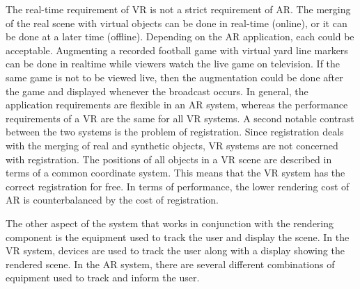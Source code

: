 The real-time requirement of VR is not a strict requirement of AR. The merging of the real scene with virtual objects can be done in real-time (online), or it can be done at a later time (offline). Depending on the AR application, each could be acceptable. Augmenting a recorded football game with virtual yard line markers can be done in realtime while viewers watch the live game on television. If the same game is not to be viewed live, then the augmentation could be done after the game and displayed whenever the broadcast occurs. In general, the application requirements are flexible in an AR system, whereas the performance requirements of a VR are the same for all VR systems. A second notable contrast between the two systems is the problem of registration. Since registration deals with the merging of real and synthetic objects, VR systems are not concerned with registration. The positions of all objects in a VR scene are described in terms of a common coordinate system. This means that the VR system has the correct registration for free. In terms of performance, the lower rendering cost of AR is counterbalanced by the cost of registration.

The other aspect of the system that works in conjunction with the rendering component is the equipment used to track the user and display the scene. In the VR system, devices are used to track the user along with a display showing the rendered scene. In the AR system, there are several different combinations of equipment used to track and inform the user.


